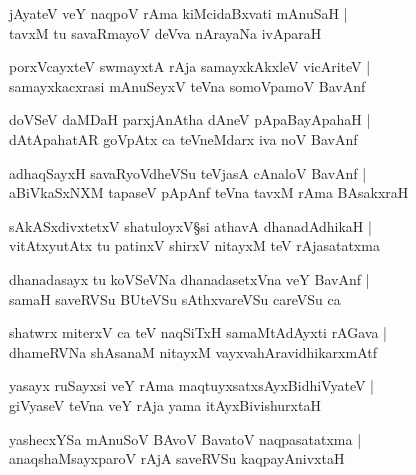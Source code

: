\begin{shloka}
jAyateV veY naqpoV rAma kiMcidaBxvati mAnuSaH |\\
tavxM tu savaRmayoV deVva nArayaNa ivAparaH 
\end{shloka}

\begin{shloka}
porxVcayxteV swmayxtA rAja\R{} samayxkAkxleV vicAriteV |\\
samayxkacxrasi mAnuSeyxV teVna somoVpamoV BavAnf 
\end{shloka}

\begin{shloka}
doVSeV daMDaH parxjAnAtha dAneV pApaBayApahaH |\\
dAtApahatAR goVpAtx ca teVneMdarx iva noV BavAnf 
\end{shloka}

\begin{shloka}
adhaqSayxH savaRyoVdheVSu teVjasA cAnaloV BavAnf |\\
aBiVkaSxNXM tapaseV pApAnf teVna tavxM rAma BAsakxraH 
\end{shloka}

\begin{shloka}
sAkASxdivxtetxV shatuloyxV\S si athavA dhanadAdhikaH |\\
vitAtxyutAtx tu patinxV shirxV nitayxM teV rAjasatatxma
\end{shloka}

\begin{shloka}
dhanadasayx tu koVSeVNa dhanadasetxVna veY BavAnf |\\
samaH saveRVSu BUteVSu sAthxvareVSu careVSu ca 
\end{shloka}

\begin{shloka}
shatwrx miterxV ca teV naqSiTxH samaMtAdAyxti rAGava |\\
dhameRVNa shAsanaM nitayxM vayxvahAravidhikarxmAtf
\end{shloka}

\begin{shloka}
yasayx ruSayxsi veY rAma maqtuyxsatxsAyxBidhiVyateV |\\
giVyaseV teVna veY rAja\R{} yama itAyxBivishurxtaH
\end{shloka}

\begin{shloka}
yashecxYSa mAnuSoV BAvoV BavatoV naqpasatatxma |\\
anaqshaMsayxparoV rAjA saveRVSu kaqpayAnivxtaH
\end{shloka}

